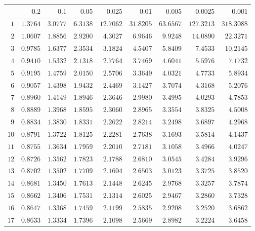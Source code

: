 \begin{tabular}{rrrrrrrrr}
  \hline
 & $0.2$ & $0.1$ & $0.05$ & $0.025$ & $0.01$ & $0.005$ & $0.0025$ & $0.001$ \\ 
  \hline
$1$ & $1.3764$ & $3.0777$ & $6.3138$ & $12.7062$ & $31.8205$ & $63.6567$ & $127.3213$ & $318.3088$ \\ 
  $2$ & $1.0607$ & $1.8856$ & $2.9200$ & $4.3027$ & $6.9646$ & $9.9248$ & $14.0890$ & $22.3271$ \\ 
  $3$ & $0.9785$ & $1.6377$ & $2.3534$ & $3.1824$ & $4.5407$ & $5.8409$ & $7.4533$ & $10.2145$ \\ 
  $4$ & $0.9410$ & $1.5332$ & $2.1318$ & $2.7764$ & $3.7469$ & $4.6041$ & $5.5976$ & $7.1732$ \\ 
  $5$ & $0.9195$ & $1.4759$ & $2.0150$ & $2.5706$ & $3.3649$ & $4.0321$ & $4.7733$ & $5.8934$ \\ 
  $6$ & $0.9057$ & $1.4398$ & $1.9432$ & $2.4469$ & $3.1427$ & $3.7074$ & $4.3168$ & $5.2076$ \\ 
  $7$ & $0.8960$ & $1.4149$ & $1.8946$ & $2.3646$ & $2.9980$ & $3.4995$ & $4.0293$ & $4.7853$ \\ 
  $8$ & $0.8889$ & $1.3968$ & $1.8595$ & $2.3060$ & $2.8965$ & $3.3554$ & $3.8325$ & $4.5008$ \\ 
  $9$ & $0.8834$ & $1.3830$ & $1.8331$ & $2.2622$ & $2.8214$ & $3.2498$ & $3.6897$ & $4.2968$ \\ 
  $10$ & $0.8791$ & $1.3722$ & $1.8125$ & $2.2281$ & $2.7638$ & $3.1693$ & $3.5814$ & $4.1437$ \\ 
  $11$ & $0.8755$ & $1.3634$ & $1.7959$ & $2.2010$ & $2.7181$ & $3.1058$ & $3.4966$ & $4.0247$ \\ 
  $12$ & $0.8726$ & $1.3562$ & $1.7823$ & $2.1788$ & $2.6810$ & $3.0545$ & $3.4284$ & $3.9296$ \\ 
  $13$ & $0.8702$ & $1.3502$ & $1.7709$ & $2.1604$ & $2.6503$ & $3.0123$ & $3.3725$ & $3.8520$ \\ 
  $14$ & $0.8681$ & $1.3450$ & $1.7613$ & $2.1448$ & $2.6245$ & $2.9768$ & $3.3257$ & $3.7874$ \\ 
  $15$ & $0.8662$ & $1.3406$ & $1.7531$ & $2.1314$ & $2.6025$ & $2.9467$ & $3.2860$ & $3.7328$ \\ 
  $16$ & $0.8647$ & $1.3368$ & $1.7459$ & $2.1199$ & $2.5835$ & $2.9208$ & $3.2520$ & $3.6862$ \\ 
  $17$ & $0.8633$ & $1.3334$ & $1.7396$ & $2.1098$ & $2.5669$ & $2.8982$ & $3.2224$ & $3.6458$ \\ 

\end{tabular}
